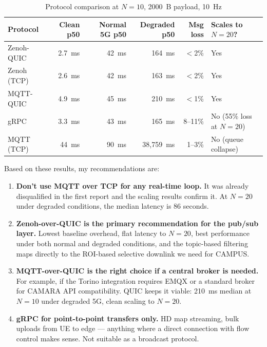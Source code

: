 \documentclass[11pt,a4paper]{article}
\begin{document}
\begin{table}[H]
\centering
\caption{Protocol comparison at $N=10$, 2000~B payload, 10~Hz}
\label{tab:summary}
\begin{tabular}{lrrrrl}
\toprule
Protocol & Clean p50 & Normal 5G p50 & Degraded p50 & Msg loss & Scales to $N=20$? \\
\midrule
Zenoh-QUIC  & 2.7~ms & 42~ms & 164~ms       & $<$2\%   & Yes \\
Zenoh (TCP) & 2.6~ms & 42~ms & 163~ms       & $<$2\%   & Yes \\
MQTT-QUIC   & 4.9~ms & 45~ms & 210~ms       & $<$1\%   & Yes \\
gRPC        & 3.3~ms & 43~ms & 165~ms       & 8--11\%  & No (55\% loss at $N=20$) \\
MQTT (TCP)  & 44~ms  & 90~ms & 38{,}759~ms  & 1--3\%   & No (queue collapse) \\
\bottomrule
\end{tabular}
\end{table}

Based on these results, my recommendations are:

\begin{enumerate}
    \item \textbf{Don't use MQTT over TCP for any real-time loop.} It was already disqualified in the first report and the scaling results confirm it. At $N=20$ under degraded conditions, the median latency is 86 seconds.

    \item \textbf{Zenoh-over-QUIC is the primary recommendation for the pub/sub layer.} Lowest baseline overhead, flat latency to $N=20$, best performance under both normal and degraded conditions, and the topic-based filtering maps directly to the ROI-based selective downlink we need for CAMPUS.

    \item \textbf{MQTT-over-QUIC is the right choice if a central broker is needed.} For example, if the Torino integration requires EMQX or a standard broker for CAMARA API compatibility. QUIC keeps it viable: 210~ms median at $N=10$ under degraded 5G, clean scaling to $N=20$.

    \item \textbf{gRPC for point-to-point transfers only.} HD map streaming, bulk uploads from UE to edge --- anything where a direct connection with flow control makes sense. Not suitable as a broadcast protocol.
\end{enumerate}
\end{document}
